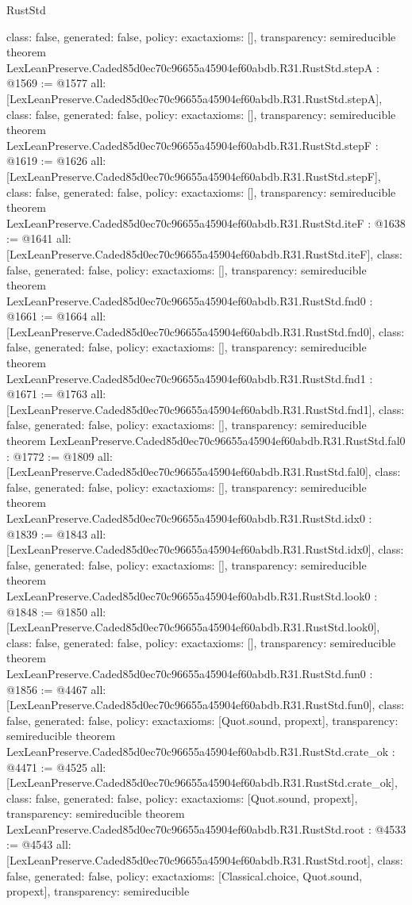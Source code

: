 \begin{lexlean}{RustStd}
\begin{coremodule}
{  class: false,
  generated: false,
  policy: exact{axioms: []},
  transparency: semireducible
}
theorem LexLeanPreserve.Caded85d0ec70c96655a45904ef60abdb.R31.RustStd.stepA : @1569 := @1577 {
  all: [LexLeanPreserve.Caded85d0ec70c96655a45904ef60abdb.R31.RustStd.stepA],
  class: false,
  generated: false,
  policy: exact{axioms: []},
  transparency: semireducible
}
theorem LexLeanPreserve.Caded85d0ec70c96655a45904ef60abdb.R31.RustStd.stepF : @1619 := @1626 {
  all: [LexLeanPreserve.Caded85d0ec70c96655a45904ef60abdb.R31.RustStd.stepF],
  class: false,
  generated: false,
  policy: exact{axioms: []},
  transparency: semireducible
}
theorem LexLeanPreserve.Caded85d0ec70c96655a45904ef60abdb.R31.RustStd.iteF : @1638 := @1641 {
  all: [LexLeanPreserve.Caded85d0ec70c96655a45904ef60abdb.R31.RustStd.iteF],
  class: false,
  generated: false,
  policy: exact{axioms: []},
  transparency: semireducible
}
theorem LexLeanPreserve.Caded85d0ec70c96655a45904ef60abdb.R31.RustStd.fnd0 : @1661 := @1664 {
  all: [LexLeanPreserve.Caded85d0ec70c96655a45904ef60abdb.R31.RustStd.fnd0],
  class: false,
  generated: false,
  policy: exact{axioms: []},
  transparency: semireducible
}
theorem LexLeanPreserve.Caded85d0ec70c96655a45904ef60abdb.R31.RustStd.fnd1 : @1671 := @1763 {
  all: [LexLeanPreserve.Caded85d0ec70c96655a45904ef60abdb.R31.RustStd.fnd1],
  class: false,
  generated: false,
  policy: exact{axioms: []},
  transparency: semireducible
}
theorem LexLeanPreserve.Caded85d0ec70c96655a45904ef60abdb.R31.RustStd.fal0 : @1772 := @1809 {
  all: [LexLeanPreserve.Caded85d0ec70c96655a45904ef60abdb.R31.RustStd.fal0],
  class: false,
  generated: false,
  policy: exact{axioms: []},
  transparency: semireducible
}
theorem LexLeanPreserve.Caded85d0ec70c96655a45904ef60abdb.R31.RustStd.idx0 : @1839 := @1843 {
  all: [LexLeanPreserve.Caded85d0ec70c96655a45904ef60abdb.R31.RustStd.idx0],
  class: false,
  generated: false,
  policy: exact{axioms: []},
  transparency: semireducible
}
theorem LexLeanPreserve.Caded85d0ec70c96655a45904ef60abdb.R31.RustStd.look0 : @1848 := @1850 {
  all: [LexLeanPreserve.Caded85d0ec70c96655a45904ef60abdb.R31.RustStd.look0],
  class: false,
  generated: false,
  policy: exact{axioms: []},
  transparency: semireducible
}
theorem LexLeanPreserve.Caded85d0ec70c96655a45904ef60abdb.R31.RustStd.fun0 : @1856 := @4467 {
  all: [LexLeanPreserve.Caded85d0ec70c96655a45904ef60abdb.R31.RustStd.fun0],
  class: false,
  generated: false,
  policy: exact{axioms: [Quot.sound, propext]},
  transparency: semireducible
}
theorem LexLeanPreserve.Caded85d0ec70c96655a45904ef60abdb.R31.RustStd.crate_ok : @4471 := @4525 {
  all: [LexLeanPreserve.Caded85d0ec70c96655a45904ef60abdb.R31.RustStd.crate_ok],
  class: false,
  generated: false,
  policy: exact{axioms: [Quot.sound, propext]},
  transparency: semireducible
}
theorem LexLeanPreserve.Caded85d0ec70c96655a45904ef60abdb.R31.RustStd.root : @4533 := @4543 {
  all: [LexLeanPreserve.Caded85d0ec70c96655a45904ef60abdb.R31.RustStd.root],
  class: false,
  generated: false,
  policy: exact{axioms: [Classical.choice, Quot.sound, propext]},
  transparency: semireducible
}


\end{coremodule}
\end{lexlean}
